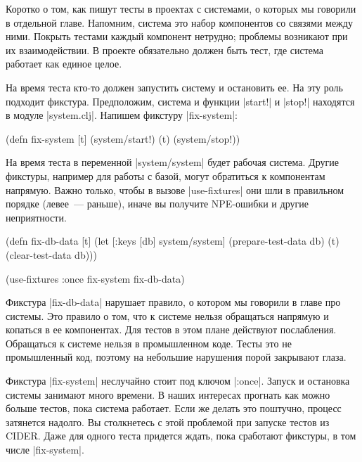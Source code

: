 Коротко о том, как пишут тесты в проектах с системами, о которых мы говорили в
отдельной главе. Напомним, система это набор компонентов со связями между
ними. Покрыть тестами каждый компонент нетрудно; проблемы возникают при их
взаимодействии. В проекте обязательно должен быть тест, где система работает как
единое целое.

На время теста кто-то должен запустить систему и остановить ее. На эту роль
подходит фикстура. Предположим, система и функции \spverb|start!| и
\spverb|stop!| находятся в модуле \spverb|system.clj|. Напишем фикстуру
\spverb|fix-system|:

\begin{english}
  \begin{clojure}
(defn fix-system [t]
  (system/start!)
  (t)
  (system/stop!))
  \end{clojure}
\end{english}

На время теста в переменной \spverb|system/system| будет рабочая система. Другие
фикстуры, например для работы с базой, могут обратиться к компонентам
напрямую. Важно только, чтобы в вызове \spverb|use-fixtures| они шли в
правильном порядке (левее~--- раньше), иначе вы получите NPE-ошибки и другие
неприятности.

\begin{english}
  \begin{clojure}
(defn fix-db-data [t]
  (let [{:keys [db]} system/system]
    (prepare-test-data db)
    (t)
    (clear-test-data db)))

(use-fixtures :once fix-system fix-db-data)
  \end{clojure}
\end{english}

Фикстура \spverb|fix-db-data| нарушает правило, о котором мы говорили в главе
про системы. Это правило о том, что к системе нельзя обращаться напрямую и
копаться в ее компонентах. Для тестов в этом плане действуют
послабления. Обращаться к системе нельзя в промышленном коде. Тесты это не
промышленный код, поэтому на небольшие нарушения порой закрывают глаза.

Фикстура \spverb|fix-system| неслучайно стоит под ключом \spverb|:once|. Запуск
и остановка системы занимают много времени. В наших интересах прогнать как можно
больше тестов, пока система работает. Если же делать это поштучно, процесс
затянется надолго. Вы столкнетесь с этой проблемой при запуске тестов из
CIDER. Даже для одного теста придется ждать, пока сработают фикстуры, в том
числе \spverb|fix-system|.

